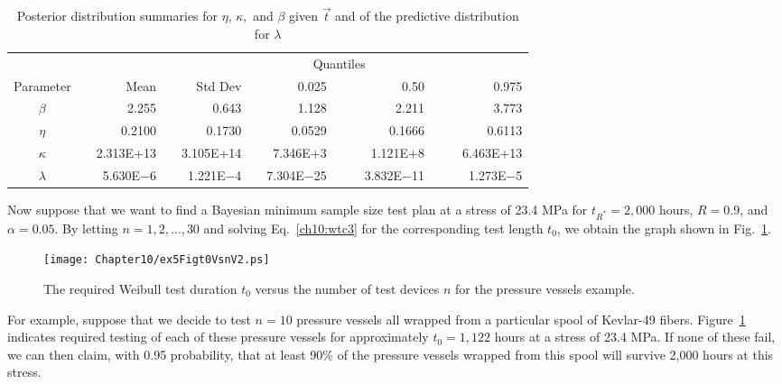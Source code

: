 \documentclass {book}
\begin{document}
\begin{sidebar}
\begin{table}
\caption{Posterior distribution summaries for $\eta$, $\kappa,$
and $\beta$ given $\vec{t}$ and of the predictive distribution for
$\lambda$}\label{ch10:tab6} \centering
\begin{tabular}{crrrrrrrrrrrr}
\hline      &       &    &      &       &
                                          \multicolumn{5}{c}{Quantiles}  &
 \\
 \cline{7-13}
  Parameter&\mbox{}&Mean  &\mbox{}&Std Dev &\mbox{}\mbox{}\mbox{}
 &\multicolumn{1}{r}{0.025}&\mbox{}&\mbox{}&0.50 & \mbox{} &  \mbox{}       & \multicolumn{1}{r}{0.975}\\
\hline
 $\beta$   &\mbox{}& 2.255&\mbox{}&   0.643&\mbox{}&      1.128&\mbox{}&  \mbox{}&  2.211&\mbox{}&   \mbox{}& 3.773\\
    $\eta$  &\mbox{}&0.2100&\mbox{}&    0.1730&\mbox{}&     0.0529&\mbox{}& \mbox{}& 0.1666&\mbox{}&  \mbox{}&    0.6113\\
    $\kappa$    &\mbox{}&2.313E+13&\mbox{}& 3.105E+14&\mbox{}&      7.346E+3&\mbox{}&   \mbox{} &1.121E+8   &\mbox{} &\mbox{} &6.463E+13\\
    $\lambda$   &\mbox{}&5.630E$-$6&\mbox{}&  1.221E$-$4&\mbox{}&       7.304E$-$25&\mbox{}&  \mbox{}&   3.832E$-$11&\mbox{}& \mbox{}&   1.273E$-$5\\
\hline
\end{tabular}
\end{table}


Now suppose that we want to find a Bayesian minimum sample size
test plan at a stress of 23.4 MPa
for $t_{R^*} = 2,000$ hours, $R = 0.9$, and $\alpha = 0.05$. By
letting $n = 1, 2, \ldots, 30$ and solving Eq.~\ref{ch10:wtc3} for
the corresponding test length $t_{0}$, we obtain the graph shown
in Fig.~\ref{ch10:fig4}.

\begin{figure}
\centerline{\texttt{[image: Chapter10/ex5Figt0VsnV2.ps]}}
\caption{The required Weibull test duration $t_{0}$ versus the
number of test devices $n$ for the pressure vessels example.}\label{ch10:fig4}
\end{figure}

For example, suppose that we decide to test $n = 10$ pressure
vessels all wrapped from a particular spool of Kevlar-49 fibers.
Figure~\ref{ch10:fig4} indicates required testing of each of these
pressure vessels for approximately $t_{0} = 1,122$ hours at a
stress of 23.4 MPa. If none of these fail, we can then claim, with
0.95 probability, that at least 90\% of the pressure vessels
wrapped from this spool will survive 2,000 hours at this stress.
\end{sidebar}
\end{document}
